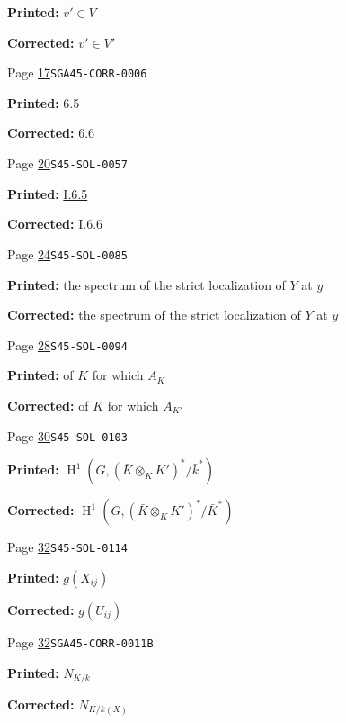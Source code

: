 \documentclass[oneside]{book}
\DeclareMathOperator{\h}{H}
\theoremstyle{sga-source}
\theoremstyle{sga-source-dash}
\theoremstyle{sga-source-dotdash}
\theoremstyle{sga-source-number-note-dash}
\theoremstyle{sga-source-note-number-dotdash}
\theoremstyle{sga-source-example-dotdash}
\theoremstyle{sga-source-inline-number}
\theoremstyle{sga-source-bare-number}
\theoremstyle{sga-source}
\begin{document}
\begin{description}
\par\noindent\textbf{Printed:} \(v'\in V\)
\par\noindent\textbf{Corrected:} \(v'\in V'\)
\smallskip
\item[\hypertarget{apparatus:EN-0007}{7}] Page \hyperlink{printpage:en:17}{17}\quad\texttt{SGA45-CORR-0006}
\par\noindent\textbf{Printed:} 6.5
\par\noindent\textbf{Corrected:} 6.6
\smallskip
\item[\hypertarget{apparatus:EN-0008}{8}] Page \hyperlink{printpage:en:20}{20}\quad\texttt{S45-SOL-0057}
\par\noindent\textbf{Printed:} \hyperref[I:1-6-6]{I.6.5}
\par\noindent\textbf{Corrected:} \hyperref[I:1-6-6]{I.6.6}
\smallskip
\item[\hypertarget{apparatus:EN-0009}{9}] Page \hyperlink{printpage:en:24}{24}\quad\texttt{S45-SOL-0085}
\par\noindent\textbf{Printed:} the spectrum of the strict localization of $Y$ at $y$
\par\noindent\textbf{Corrected:} the spectrum of the strict localization of $Y$ at $\bar y$
\smallskip
\item[\hypertarget{apparatus:EN-0010}{10}] Page \hyperlink{printpage:en:28}{28}\quad\texttt{S45-SOL-0094}
\par\noindent\textbf{Printed:} of $K$ for which $A_K$
\par\noindent\textbf{Corrected:} of $K$ for which $A_{K'}$
\smallskip
\item[\hypertarget{apparatus:EN-0011}{11}] Page \hyperlink{printpage:en:30}{30}\quad\texttt{S45-SOL-0103}
\par\noindent\textbf{Printed:} \(\h^1\left(G,(\bar K\otimes_K K')^*/\bar k^*\right)\)
\par\noindent\textbf{Corrected:} \(\h^1\left(G,(\bar K\otimes_K K')^*/\bar K^*\right)\)
\smallskip
\item[\hypertarget{apparatus:EN-0012}{12}] Page \hyperlink{printpage:en:32}{32}\quad\texttt{S45-SOL-0114}
\par\noindent\textbf{Printed:} \(g(X_{ij})\)
\par\noindent\textbf{Corrected:} \(g(U_{ij})\)
\smallskip
\item[\hypertarget{apparatus:EN-0013}{13}] Page \hyperlink{printpage:en:32}{32}\quad\texttt{SGA45-CORR-0011B}
\par\noindent\textbf{Printed:} \(N_{K/k}\)
\par\noindent\textbf{Corrected:} \(N_{K/k(X)}\)

\end{description}
\end{document}
